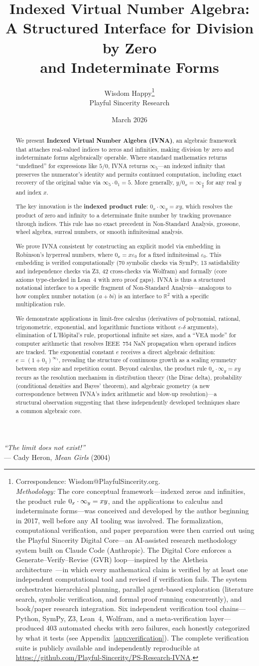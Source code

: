 \documentclass[12pt]{article}
\title{Indexed Virtual Number Algebra: \\
A Structured Interface for Division by Zero \\
and Indeterminate Forms}
\author{Wisdom Happy\thanks{Correspondence: Wisdom@PlayfulSincerity.org. \\[0.5em]
\textit{Methodology:} The core conceptual framework---indexed zeros and infinities, the product rule $\vz{x} \cdot \vi{y} = xy$, and the applications to calculus and indeterminate forms---was conceived and developed by the author beginning in 2017, well before any AI tooling was involved. The formalization, computational verification, and paper preparation were then carried out using the Playful Sincerity Digital Core---an AI-assisted research methodology system built on Claude Code (Anthropic). The Digital Core enforces a Generate--Verify--Revise (GVR) loop---inspired by the Aletheia architecture~\cite{feng2026aletheia}---in which every mathematical claim is verified by at least one independent computational tool and revised if verification fails. The system orchestrates hierarchical planning, parallel agent-based exploration (literature search, symbolic verification, and formal proof running concurrently), and book/paper research integration. Six independent verification tool chains---Python, SymPy, Z3, Lean~4, Wolfram, and a meta-verification layer---produced 403 automated checks with zero failures, each honestly categorized by what it tests (see Appendix~\ref{app:verification}). The complete verification suite is publicly available and independently reproducible at \url{https://github.com/Playful-Sincerity/PS-Research-IVNA}.} \\[0.3em]
Playful Sincerity Research}
\date{March 2026}
\theoremstyle{definition}
\theoremstyle{remark}
\newcommand{\vz}[1]{0_{#1}}             %
\newcommand{\vi}[1]{\infty_{#1}}        %
\newcommand{\R}{\mathbb{R}}
\begin{document}
\maketitle

\begin{center}
\textit{``The limit does not exist!''}\\[0.3em]
--- Cady Heron, \textit{Mean Girls} (2004)
\end{center}
\vspace{1em}

\begin{abstract}
We present \textbf{Indexed Virtual Number Algebra (IVNA)}, an algebraic framework
that attaches real-valued indices to zeros and infinities, making division by zero
and indeterminate forms algebraically operable. Where standard mathematics
returns ``undefined'' for expressions like $5/0$, IVNA returns $\vi{5}$---an
indexed infinity that preserves the numerator's identity and permits continued
computation, including exact recovery of the original value via
$\vi{5} \cdot \vz{1} = 5$. More generally, $y / \vz{x} = \vi{\frac{y}{x}}$ for any
real $y$ and index $x$.

The key innovation is the \textbf{indexed product rule}: $\vz{x} \cdot \vi{y} = xy$,
which resolves the product of zero and infinity to a determinate finite number
by tracking provenance through indices. This rule has no exact precedent in
Non-Standard Analysis, grossone, wheel algebra, surreal numbers, or smooth
infinitesimal analysis.

We prove IVNA consistent by constructing an explicit model via embedding in
Robinson's hyperreal numbers, where $\vz{x} = x\varepsilon_0$ for a fixed
infinitesimal $\varepsilon_0$. This embedding is verified computationally
(70 symbolic checks via SymPy, 13 satisfiability and independence checks via Z3,
42 cross-checks via Wolfram) and formally
(core axioms type-checked in Lean~4 with zero proof gaps). IVNA is thus a structured notational
interface to a specific fragment of Non-Standard Analysis---analogous to how
complex number notation ($a + bi$) is an interface to $\R^2$ with a specific
multiplication rule.

We demonstrate applications in limit-free calculus (derivatives of polynomial,
rational, trigonometric, exponential, and logarithmic functions without
$\varepsilon$-$\delta$ arguments), elimination of L'H\^opital's rule,
proportional infinite set sizes, and a ``VEA mode'' for computer arithmetic
that resolves IEEE~754 NaN propagation when operand indices are tracked. The exponential
constant $e$ receives a direct algebraic definition:
$e = (1 + \vz{1})^{\vi{1}}$, revealing the structure of continuous growth
as a scaling symmetry between step size and repetition count.
Beyond calculus, the product rule $\vz{x} \cdot \vi{y} = xy$ recurs as
the resolution mechanism in distribution theory (the Dirac delta),
probability (conditional densities and Bayes' theorem), and algebraic
geometry (a new correspondence between IVNA's index arithmetic and
blow-up resolution)---a structural observation suggesting that these
independently developed techniques share a common algebraic core.
\end{abstract}
\end{document}
